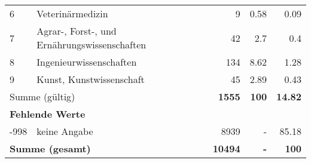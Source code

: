 \begin{longtable}{lXrrr}
     6 &
     \multicolumn{1}{X}{ Veterinärmedizin   } &


       \num{9} &
       \num[round-mode=places,round-precision=2]{0,58} &
         \num[round-mode=places,round-precision=2]{0,09} \\

     7 &
     \multicolumn{1}{X}{ Agrar-, Forst-, und Ernährungswissenschaften   } &


       \num{42} &
       \num[round-mode=places,round-precision=2]{2,7} &
         \num[round-mode=places,round-precision=2]{0,4} \\

     8 &
     \multicolumn{1}{X}{ Ingenieurwissenschaften   } &


       \num{134} &
       \num[round-mode=places,round-precision=2]{8,62} &
         \num[round-mode=places,round-precision=2]{1,28} \\

     9 &
     \multicolumn{1}{X}{ Kunst, Kunstwissenschaft   } &


       \num{45} &
       \num[round-mode=places,round-precision=2]{2,89} &
         \num[round-mode=places,round-precision=2]{0,43} \\
     \midrule
     \multicolumn{2}{l}{Summe (gültig)} &
       \textbf{\num{1555}} &
     \textbf{100} &
       \textbf{\num[round-mode=places,round-precision=2]{14,82}} \\
     \multicolumn{5}{l}{\textbf{Fehlende Werte}}\\
       -998 &
       keine Angabe &
         \num{8939} &
        - &
         \num[round-mode=places,round-precision=2]{85,18} \\
     \midrule
     \multicolumn{2}{l}{\textbf{Summe (gesamt)}} &
          \textbf{\num{10494}} &
        \textbf{-} &
        \textbf{100} \\
     \bottomrule
     \end{longtable}
     
